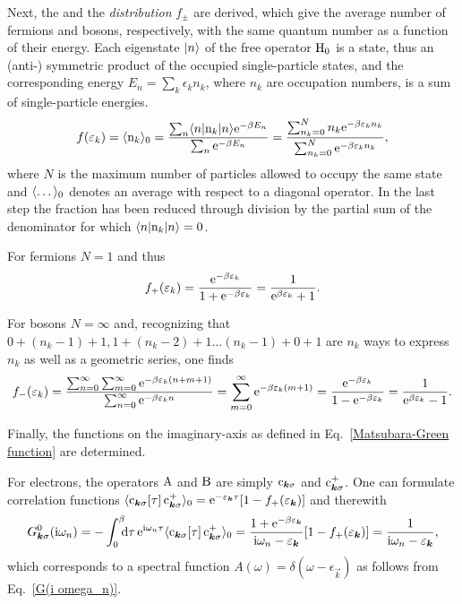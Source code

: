Next, the \emph{} and the \emph{
distribution} $f_\pm$ are derived, which give the average number of fermions and
bosons, respectively, with the same quantum number as a function of their
energy. Each eigenstate $|n\rangle$ of the free  operator $\mathrm H_0$
is a  state, thus an (anti-) symmetric product of the occupied
single-particle states, and the corresponding energy $E_n = \sum_k \epsilon_k
n_k$, where $n_k$ are occupation numbers, is a sum of single-particle energies.
%
\begin{equation*}
    f(\varepsilon_k) = \langle\mathrm n_k\rangle_0
    = \frac{\sum_n \langle n| \mathrm n_k |n\rangle \mathrm e^{-\beta E_n}}
        {\sum_n \mathrm e^{-\beta E_n}}
    = \frac{\sum_{n_k = 0}^N n_k \mathrm e^{-\beta \varepsilon_k n_k}}
        {\sum_{n_k = 0}^N \mathrm e^{-\beta \varepsilon_k n_k}},
\end{equation*}
%
where $N$ is the maximum number of particles allowed to occupy the same state
and $\langle\dots\rangle_0$ denotes an average with respect to a diagonal 
operator. In the last step the fraction has been reduced through division by the
partial sum of the denominator for which $\langle n| \mathrm n_k |n\rangle = 0$.

For fermions $N = 1$ and thus
%
\begin{equation*}
    f_+(\varepsilon_k) = \frac{\mathrm e^{-\beta \varepsilon_k}}{1 + \mathrm e^{-\beta \varepsilon_k}}
    = \frac 1 {\mathrm e^{\beta \varepsilon_k} + 1}.
\end{equation*}

For bosons $N = \infty$ and, recognizing that $0 + (n_k - 1) + 1, 1 + (n_k - 2)
+ 1 \dots (n_k - 1) + 0 + 1$ are $n_k$ ways to express $n_k$ as well as a
geometric series, one finds
%
\begin{equation*}
    f_-(\varepsilon_k)
    = \frac {\sum_{n = 0}^\infty \sum_{m = 0}^\infty
        \mathrm e^{-\beta \varepsilon_k (n + m + 1)}}
        {\sum_{n = 0}^\infty \mathrm e^{-\beta \varepsilon_k n}}
    = \sum_{m = 0}^\infty \mathrm e^{-\beta \varepsilon_k (m + 1)}
    = \frac{\mathrm e^{-\beta \varepsilon_k}}{1 - \mathrm e^{-\beta \varepsilon_k}}
    = \frac 1 {\mathrm e^{\beta \varepsilon_k} - 1}.
\end{equation*}

Finally, the  functions on the imaginary-axis as defined in
Eq.~\ref{Matsubara-Green function} are determined.

For electrons, the operators $\mathrm A$ and $\mathrm B$ are simply $\mathrm c_{\boldsymbol k
\sigma}$ and $\mathrm c_{\boldsymbol k \sigma}^+$. One can formulate correlation functions
$\langle\mathrm c_{\boldsymbol k \sigma}[\tau] \, \mathrm c_{\boldsymbol k \sigma}^+\rangle_0 =
\mathrm e^{-\varepsilon_{\boldsymbol k} \tau} [1 - f_+(\varepsilon_{\boldsymbol k})]$ and therewith
%
\begin{equation} \label{G_0(i omega_n)}
    G_{\vec k \sigma}^0(\I \omega_n)
    = -\int \from 0 \till \beta \D \tau \, \E^{\I \omega_n \tau}
    \av{\op c_{\vec k \sigma}[\tau] \, \op c_{\vec k \sigma}^+}_0
    = \frac
        {1 + \E^{-\beta \epsilon_{\vec k}}}
        {\I \omega_n - \epsilon_{\vec k}}
        [1 - f_+(\epsilon_{\vec k})]
    = \frac 1 {\I \omega_n - \epsilon_{\vec k}},
\end{equation}
%
which corresponds to a spectral function $A(\omega) = \delta(\omega -
\epsilon_{\vec k})$ as follows from Eq.~\ref{G(i omega_n)}.

